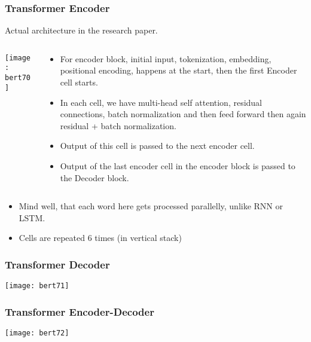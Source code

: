 \begin{frame}[fragile]\frametitle{Transformer Encoder}

Actual architecture in the research paper.

\begin{columns}
    \begin{column}[T]{0.4\linewidth}
			\begin{center}
			\texttt{[image: bert70]}
			\end{center}		
		\end{column}
    \begin{column}[T]{0.6\linewidth}
      \begin{itemize}
			\item For encoder block, initial input, tokenization, embedding, positional encoding, happens at the start, then the first Encoder cell starts.
			\item In each cell, we have multi-head self attention, residual connections, batch normalization and then feed forward then again residual + batch normalization.
			\item Output of this cell is passed to the next encoder cell.
			\item Output of the last encoder cell in the encoder block is passed to the Decoder block.
			\end{itemize}
    \end{column}
  \end{columns}
		
     \begin{itemize}
			\item Mind well, that each word here gets processed parallelly, unlike RNN or LSTM.
			\item Cells are repeated 6 times (in vertical stack)
			\end{itemize}		
\end{frame}

\begin{frame}[fragile]\frametitle{Transformer Decoder}


			\begin{center}
			\texttt{[image: bert71]}
			\end{center}		

			
\end{frame}

\begin{frame}[fragile]\frametitle{Transformer Encoder-Decoder}

			\begin{center}
			\texttt{[image: bert72]}
			\end{center}		

			
\end{frame}

